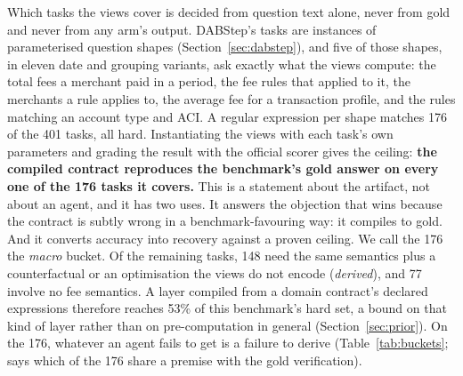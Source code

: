 Which tasks the views cover is decided from question text alone, never
from gold and never from any arm's output. DABStep's tasks are instances of
parameterised question shapes (Section~\ref{sec:dabstep}), and five of
those shapes, in eleven date and grouping variants, ask exactly what the
views compute: the total fees a merchant paid in a period, the fee rules
that applied to it, the merchants a rule applies to, the average fee for a
transaction profile, and the rules matching an account type and ACI. A
regular expression per shape matches 176 of the 401 tasks, all hard.
Instantiating the views with each task's own parameters and grading the
result with the official scorer gives the ceiling: \textbf{the compiled
contract reproduces the benchmark's gold answer on every one of the 176
tasks it covers.} This is a statement about the artifact, not about an
agent, and it has two uses. It answers the objection that \armC{} wins
because the contract is subtly wrong in a benchmark-favouring way: it
compiles to gold. And it converts accuracy into recovery against a proven
ceiling. We call the 176 the \emph{macro} bucket. Of the remaining tasks,
148 need the same semantics plus a counterfactual or an optimisation the
views do not encode (\emph{derived}), and 77 involve no fee semantics. A
layer compiled from a domain contract's declared expressions therefore
reaches 53\% of this benchmark's hard set, a bound on that kind of layer
rather than on pre-computation in general (Section~\ref{sec:prior}). On
the 176, whatever an agent fails to get is a failure to derive
(Table~\ref{tab:buckets};  says which of the 176 share a
premise with the gold verification).

